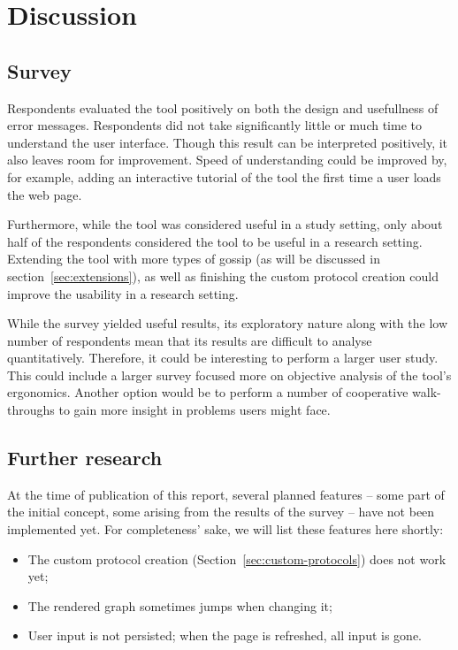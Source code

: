 
\section{Discussion}

\subsection{Survey}

Respondents evaluated the tool positively on both the design and usefullness of error messages.
Respondents did not take significantly little or much time to understand the user interface.
Though this result can be interpreted positively, it also leaves room for improvement.
Speed of understanding could be improved by, for example, adding an interactive tutorial of the tool the first time a user loads the web page.

Furthermore, while the tool was considered useful in a study setting, only about half of the respondents considered the tool to be useful in a research setting.
Extending the tool with more types of gossip (as will be discussed in section~\ref{sec:extensions}), as well as finishing the custom protocol creation could improve the usability in a research setting.

While the survey yielded useful results, its exploratory nature along with the low number of respondents mean that its results are difficult to analyse quantitatively.
Therefore, it could be interesting to perform a larger user study.
This could include a larger survey focused more on objective analysis of the tool's ergonomics.
Another option would be to perform a number of cooperative walk-throughs to gain more insight in problems users might face.

\subsection{Further research}

At the time of publication of this report, several planned features -- some part of the initial concept, some arising from the results of the survey -- have not been implemented yet. For completeness' sake, we will list these features here shortly:

\begin{itemize}
    \item The custom protocol creation (Section~\ref{sec:custom-protocols}) does not work yet;
    \item The rendered graph sometimes jumps when changing it;
    \item User input is not persisted; when the page is refreshed, all input is gone.
\end{itemize}

